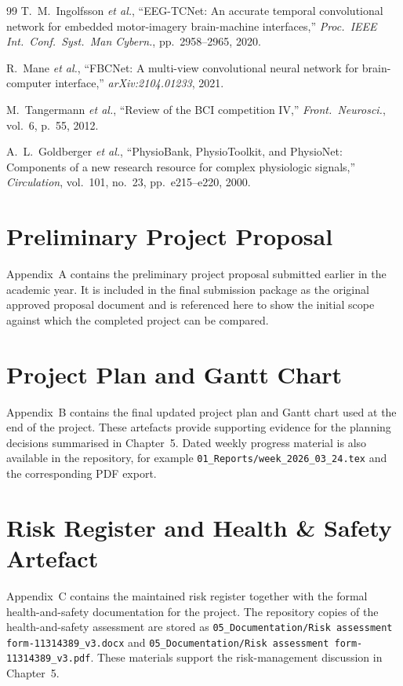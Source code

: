 \documentclass[12pt, a4paper]{article}
\begin{document}
\begin{thebibliography}{99}
T.~M.~Ingolfsson \emph{et al.}, ``EEG-TCNet: An accurate temporal convolutional network for embedded motor-imagery brain-machine interfaces,'' \textit{Proc.\ IEEE Int.\ Conf.\ Syst.\ Man Cybern.}, pp.~2958--2965, 2020.

R.~Mane \emph{et al.}, ``FBCNet: A multi-view convolutional neural network for brain-computer interface,'' \textit{arXiv:2104.01233}, 2021.

M.~Tangermann \emph{et al.}, ``Review of the BCI competition IV,'' \textit{Front.\ Neurosci.}, vol.~6, p.~55, 2012.

A.~L.~Goldberger \emph{et al.}, ``PhysioBank, PhysioToolkit, and PhysioNet: Components of a new research resource for complex physiologic signals,'' \textit{Circulation}, vol.~101, no.~23, pp.~e215--e220, 2000.
\end{thebibliography}

\clearpage
\appendix

\section{Preliminary Project Proposal}

Appendix~A contains the preliminary project proposal submitted earlier in the academic year. It is included in the final submission package as the original approved proposal document and is referenced here to show the initial scope against which the completed project can be compared.

\section{Project Plan and Gantt Chart}

Appendix~B contains the final updated project plan and Gantt chart used at the end of the project. These artefacts provide supporting evidence for the planning decisions summarised in Chapter~5. Dated weekly progress material is also available in the repository, for example \texttt{01\_Reports/week\_2026\_03\_24.tex} and the corresponding PDF export.

\section{Risk Register and Health \& Safety Artefact}

Appendix~C contains the maintained risk register together with the formal health-and-safety documentation for the project. The repository copies of the health-and-safety assessment are stored as \texttt{05\_Documentation/Risk assessment form-11314389\_v3.docx} and \texttt{05\_Documentation/Risk assessment form-11314389\_v3.pdf}. These materials support the risk-management discussion in Chapter~5.
\end{document}
